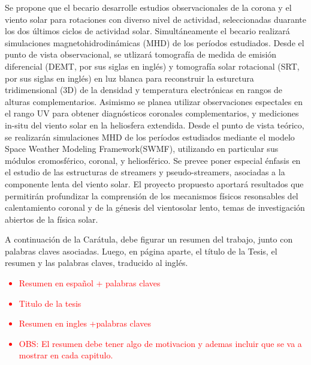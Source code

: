 \begin{center}
Se propone que el becario desarrolle estudios observacionales de la corona y el viento solar para rotaciones con diverso nivel de actividad, seleccionadas duarante los dos últimos ciclos de actividad solar. Simultáneamente el becario realizará simulaciones magnetohidrodinámicas (MHD) de los períodos estudiados. Desde el punto de vista observacional, se utlizará tomografía de medida de emisión diferencial (DEMT, por sus siglas en inglés) y tomografía solar rotacional (SRT, por sus siglas en inglés) en luz blanca para reconstruir la esturctura tridimensional (3D) de la densidad y temperatura electrónicas en rangos de alturas complementarios. Asimismo se planea utilizar observaciones espectales en el rango UV para obtener diagnósticos coronales complementarios, y mediciones in-situ del viento solar en la heliosfera extendida. Desde el punto de vista teórico, se realizarán simulaciones MHD de los períodos estudiados mediante el modelo Space Weather Modeling Framework(SWMF), utilizando en particular sus módulos cromosférico, coronal, y heliosférico. Se prevee poner especial énfasis en el estudio de las estructuras de streamers y pseudo-streamers, asociadas a la componente lenta del viento solar. El proyecto propuesto aportará resultados que permitirán profundizar la comprensión de los mecanismos físicos resonsables del calentamiento coronal y de la génesis del vientosolar lento, temas de investigación abiertos de la física solar.


A continuación de la Carátula, debe figurar un resumen del trabajo, junto con palabras claves asociadas. Luego, en página aparte, el título de la Tesis, el resumen y las palabras claves, traducido al inglés.

\textcolor{red}{
\begin{itemize}
  \item Resumen en español + palabras claves \\
  \item Titulo de la tesis\\
  \item Resumen en ingles +palabras claves\\
  \item OBS: El resumen debe tener algo de motivacion y ademas incluir que se va a mostrar en cada capitulo.\\
\end{itemize}
}

\end{center}

{} 
